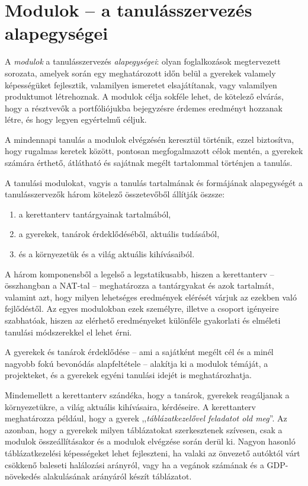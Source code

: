\section{Modulok -- a tanulásszervezés alapegységei}
\label{sec:modulok}

A \emph{modulok} a tanulásszervezés \emph{alapegységei}: olyan foglalkozások megtervezett sorozata, amelyek során egy meghatározott időn belül a gyerekek valamely képességüket fejlesztik, valamilyen ismeretet elsajátítanak, vagy valamilyen produktumot létrehoznak. A modulok célja sokféle lehet, de kötelező elvárás, hogy a résztvevők a portfóliójukba bejegyzésre érdemes eredményt hozzanak létre, és hogy legyen egyértelmű céljuk.

A mindennapi tanulás a modulok elvégzésén keresztül történik, ezzel biztosítva, hogy rugalmas keretek között, pontosan megfogalmazott célok mentén, a gyerekek számára érthető, átlátható és sajátnak megélt tartalommal történjen a tanulás.

A tanulási modulokat, vagyis a tanulás tartalmának és
formájának\linebreak
alapegységét a tanulásszervezők három kötelező összetevőből állítják ösz\-sze:

\begin{enumerate}
      \item
            a kerettanterv tantárgyainak tartalmából,
      \item
            a gyerekek, tanárok érdeklődéséből, aktuális tudásából,
      \item
            és a környezetük és a világ aktuális kihívásaiból.
\end{enumerate}

A három komponensből a legelső a legstatikusabb, hiszen a kerettanterv -- összhangban a NAT-tal -- meghatározza a tantárgyakat és azok tartalmát, valamint azt, hogy milyen lehetséges eredmények elérését várjuk az ezekben való fejlődéstől. Az egyes modulokban ezek személyre, illetve a csoport igényeire szabhatóak, hiszen az elérhető eredményeket különféle gyakorlati és elméleti tanulási módszerekkel el lehet érni.

A gyerekek és tanárok érdeklődése -- ami a sajátként megélt cél és a minél nagyobb fokú bevonódás alapfeltétele -- alakítja ki a modulok témáját, a projekteket, és a gyerekek egyéni tanulási idejét is meghatározhatja.

Mindemellett a kerettanterv szándéka, hogy a tanárok, gyerekek reagáljanak a környezetükre, a világ aktuális kihívásaira, kérdéseire. A kerettanterv meghatározza például, hogy a gyerek ,,\emph{táblázatkezelővel feladatot old meg}''. Az azonban, hogy a gyerekek milyen táblázatokat szerkesztenek szívesen, csak a modulok összeállításakor és a modulok elvégzése során derül ki. Nagyon hasonló táblázatkezelési képességeket lehet fejleszteni, ha valaki az önvezető autóktól várt csökkenő baleseti halálozási arányról, vagy ha a vegánok számának és a GDP-növekedés alakulásának arányáról készít táblázatot.

